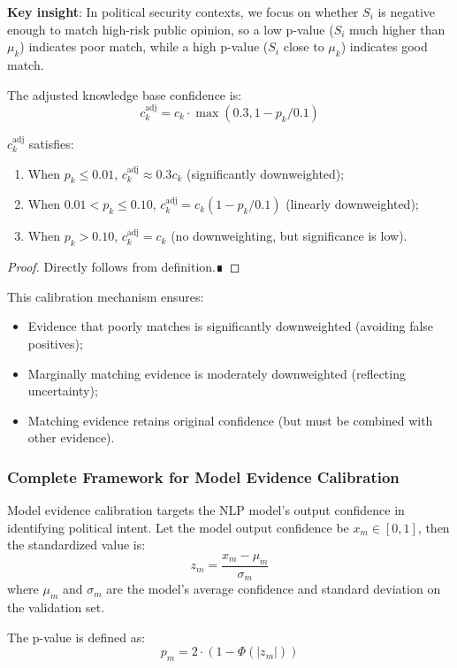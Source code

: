 \documentclass[11pt,a4paper]{report}
\newcommand{\Phi}{\varPhi}
\begin{document}
\textbf{Key insight}: In political security contexts, we focus on whether $S_i$ is negative enough to match high-risk public opinion, so a low p-value ($S_i$ much higher than $\mu_k$) indicates poor match, while a high p-value ($S_i$ close to $\mu_k$) indicates good match.

The adjusted knowledge base confidence is:
\[
c_k^{\text{adj}} = c_k \cdot \max(0.3, 1 - p_k/0.1)
\]

\begin{theorem}
$c_k^{\text{adj}}$ satisfies:
\begin{enumerate}
    \item When $p_k \leq 0.01$, $c_k^{\text{adj}} \approx 0.3c_k$ (significantly downweighted);
    \item When $0.01 < p_k \leq 0.10$, $c_k^{\text{adj}} = c_k(1 - p_k/0.1)$ (linearly downweighted);
    \item When $p_k > 0.10$, $c_k^{\text{adj}} = c_k$ (no downweighting, but significance is low).
\end{enumerate}
\end{theorem}

\begin{proof}
Directly follows from definition.∎
\end{proof}

This calibration mechanism ensures:
\begin{itemize}
    \item Evidence that poorly matches is significantly downweighted (avoiding false positives);
    \item Marginally matching evidence is moderately downweighted (reflecting uncertainty);
    \item Matching evidence retains original confidence (but must be combined with other evidence).
\end{itemize}

\subsubsection{Complete Framework for Model Evidence Calibration}

Model evidence calibration targets the NLP model's output confidence in identifying political intent. Let the model output confidence be $x_m \in [0,1]$, then the standardized value is:
\[
z_m = \frac{x_m - \mu_m}{\sigma_m}
\]
where $\mu_m$ and $\sigma_m$ are the model's average confidence and standard deviation on the validation set.

The p-value is defined as:
\[
p_m = 2 \cdot (1 - \Phi(|z_m|))
\]
\end{document}
